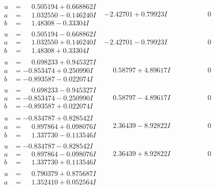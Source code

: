 \documentclass[1p]{elsarticle_modified}
\theoremstyle{definition}
\begin{document}
$$\begin{array}{c|c|c}
 \hline 
\begin{aligned}
u &= \phantom{-}0.505194 + 0.668862 I \\
a &= \phantom{-}1.032550 - 0.146240 I \\
b &= \phantom{-}1.48308 - 0.33304 I\end{aligned}
 & -2.42701 + 0.79923 I & \phantom{-0.000000 } 0 \\ \hline\begin{aligned}
u &= \phantom{-}0.505194 - 0.668862 I \\
a &= \phantom{-}1.032550 + 0.146240 I \\
b &= \phantom{-}1.48308 + 0.33304 I\end{aligned}
 & -2.42701 - 0.79923 I & \phantom{-0.000000 } 0 \\ \hline\begin{aligned}
u &= \phantom{-}0.698233 + 0.945327 I \\
a &= -0.853474 + 0.250990 I \\
b &= -0.893587 - 0.022074 I\end{aligned}
 & \phantom{-}0.58797 + 4.89617 I & \phantom{-0.000000 } 0 \\ \hline\begin{aligned}
u &= \phantom{-}0.698233 - 0.945327 I \\
a &= -0.853474 - 0.250990 I \\
b &= -0.893587 + 0.022074 I\end{aligned}
 & \phantom{-}0.58797 - 4.89617 I & \phantom{-0.000000 } 0 \\ \hline\begin{aligned}
u &= -0.834787 + 0.828542 I \\
a &= \phantom{-}0.897864 + 0.098076 I \\
b &= \phantom{-}1.337730 - 0.113546 I\end{aligned}
 & \phantom{-}2.36439 - 8.92822 I & \phantom{-0.000000 } 0 \\ \hline\begin{aligned}
u &= -0.834787 - 0.828542 I \\
a &= \phantom{-}0.897864 - 0.098076 I \\
b &= \phantom{-}1.337730 + 0.113546 I\end{aligned}
 & \phantom{-}2.36439 + 8.92822 I & \phantom{-0.000000 } 0 \\ \hline\begin{aligned}
u &= \phantom{-}0.790379 + 0.875687 I \\
a &= \phantom{-}1.352410 + 0.052564 I \\

\end{aligned}
\end{array}$$
\end{document}
